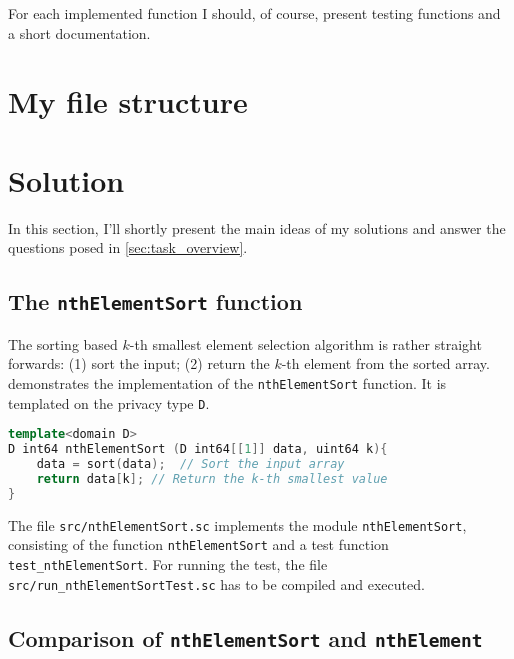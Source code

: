 \documentclass[11pt]{article}
\newcommand{\ct}[1]{\texttt{#1}}
\begin{document}
For each implemented function I should, of course, present testing functions and a short documentation. 


\section{My file structure} %
\label{sec:my_file_structure}


\section{Solution} %
\label{sec:solutions}

In this section, I'll shortly present the main ideas of my solutions and answer the questions posed in \cref{sec:task_overview}. 

\subsection{The \ct{nthElementSort} function} %
\label{sub:nthelementsort}

The sorting based $k$-th smallest element selection algorithm is rather straight forwards: (1) sort the input; (2) return the $k$-th element from the sorted array.  demonstrates the implementation of the \ct{nthElementSort} function. It is templated on the privacy type \ct{D}.  

\begin{lstlisting}[caption={The \ct{nthElementSort} function, which is templated on the privacy type \ct{D}.}, label={lst:nthElementSort}, language=C++]
template<domain D>
D int64 nthElementSort (D int64[[1]] data, uint64 k){    
    data = sort(data); 	// Sort the input array
    return data[k];	// Return the k-th smallest value
}
\end{lstlisting}

The file \ct{src/nthElementSort.sc} implements the module \ct{nthElementSort}, consisting of the function \ct{nthElementSort} and a test function \ct{test\_nthElementSort}. For running the test, the file \ct{src/run\_nthElementSortTest.sc} has to be compiled and executed. 


\subsection{Comparison of \ct{nthElementSort} and \ct{nthElement}} %
\label{sub:comparison_of_nthelementsort_and_nthelement}
\end{document}
